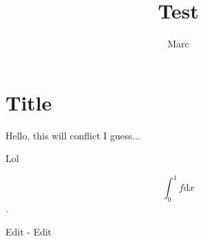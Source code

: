 \documentclass{article}
\begin{document}
\author{Marc}
\title{Test}
\maketitle

\section{Title}
\label{sec:title}
Hello, this will conflict I guess...

Lol


$$ \int_0^1 f \mathrm{d}x $$.

Edit - Edit 
\end{document}
